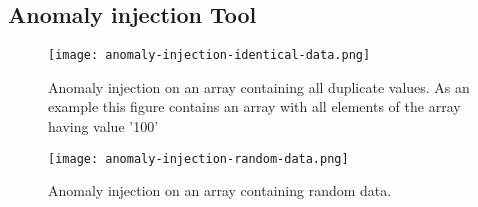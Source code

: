 \subsection*{\textbf{Anomaly injection Tool}} 
\begin{figure}
\centerline{\texttt{[image: anomaly-injection-identical-data.png]}}
    \caption{Anomaly injection on an array containing all duplicate values. As an example this figure contains an array with all elements of the array having value '100'}
    \label{fig:ai_iden}
\end{figure}

\begin{figure}
\centerline{\texttt{[image: anomaly-injection-random-data.png]}}
    \caption{Anomaly injection on an array containing random data.}
    \label{fig:ai_rd}
\end{figure}
